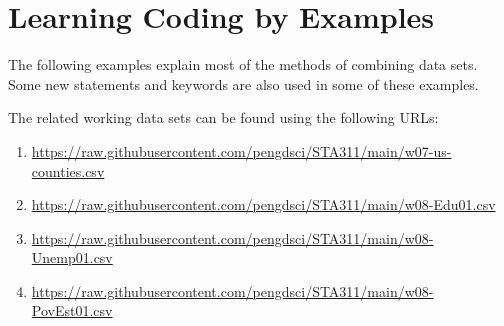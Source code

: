 \documentclass[
]{book}
\begin{document}
\hypertarget{learning-coding-by-examples-4}{%
\section{Learning Coding by Examples}\label{learning-coding-by-examples-4}}

The following examples explain most of the methods of combining data sets. Some new statements and keywords are also used in some of these examples.

The related working data sets can be found using the following URLs:

\begin{enumerate}
\def\labelenumi{\arabic{enumi}.}
\item
  \url{https://raw.githubusercontent.com/pengdsci/STA311/main/w07-us-counties.csv}
\item
  \url{https://raw.githubusercontent.com/pengdsci/STA311/main/w08-Edu01.csv}
\item
  \url{https://raw.githubusercontent.com/pengdsci/STA311/main/w08-Unemp01.csv}
\item
  \url{https://raw.githubusercontent.com/pengdsci/STA311/main/w08-PovEst01.csv}
\end{enumerate}
\end{document}
